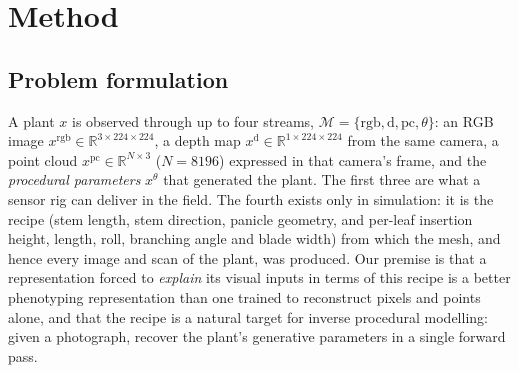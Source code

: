 %
%
%

\providecommand{\todo}[1]{\textcolor{red}{[TODO: #1]}}
\newcommand{\rgb}{\mathrm{rgb}}
\newcommand{\dep}{\mathrm{d}}
\newcommand{\pc}{\mathrm{pc}}
\newcommand{\prm}{\theta}
\newcommand{\Mods}{\mathcal{M}}
\newcommand{\vis}{\mathcal{V}}

\section{Method}
\label{sec:method}

\subsection{Problem formulation}
\label{sec:problem}

A plant $x$ is observed through up to four streams,
$\Mods=\{\rgb,\dep,\pc,\prm\}$: an RGB image $x^{\rgb}\in\mathbb{R}^{3\times224\times224}$,
a depth map $x^{\dep}\in\mathbb{R}^{1\times224\times224}$ from the same camera, a
point cloud $x^{\pc}\in\mathbb{R}^{N\times3}$ ($N{=}8196$) expressed in that camera's
frame, and the \emph{procedural parameters} $x^{\prm}$ that generated the plant.
The first three are what a sensor rig can deliver in the field. The fourth exists
only in simulation: it is the recipe (stem length, stem direction, panicle
geometry, and per-leaf insertion height, length, roll, branching angle and blade
width) from which the mesh, and hence every image and scan of the plant, was
produced. Our premise is that a representation forced to \emph{explain} its visual
inputs in terms of this recipe is a better phenotyping representation than one
trained to reconstruct pixels and points alone, and that the recipe is a natural
target for inverse procedural modelling: given a photograph, recover the plant's
generative parameters in a single forward pass.

